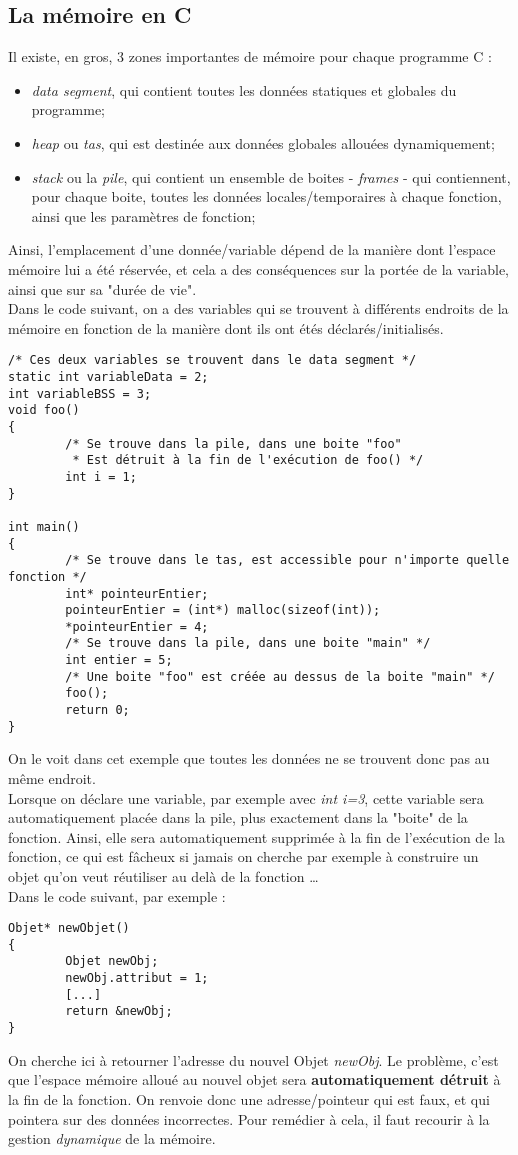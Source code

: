 \documentclass{report}
\begin{document}
\subsection{La mémoire en C}
Il existe, en gros, 3 zones importantes de mémoire pour chaque programme C :
\begin{itemize}
\item{\emph{data segment}, qui contient toutes les données statiques et globales du programme;}
\item{\emph{heap} ou \emph{tas}, qui est destinée aux données globales allouées dynamiquement;}
\item{\emph{stack} ou la \emph{pile}, qui contient un ensemble de boites - \emph{frames} - qui contiennent, pour chaque boite, toutes les données locales/temporaires à chaque fonction, ainsi que les paramètres de fonction;}
\end{itemize}
Ainsi, l'emplacement d'une donnée/variable dépend de la manière dont l'espace mémoire lui a été réservée, et cela a des conséquences sur la portée de la variable, ainsi que sur sa "durée de vie". \\
Dans le code suivant, on a des variables qui se trouvent à différents endroits de la mémoire en fonction de la manière dont ils ont étés déclarés/initialisés.
\begin{lstlisting}
/* Ces deux variables se trouvent dans le data segment */
static int variableData = 2;
int variableBSS = 3;
void foo()
{
        /* Se trouve dans la pile, dans une boite "foo"
         * Est détruit à la fin de l'exécution de foo() */
        int i = 1;
}

int main()
{
        /* Se trouve dans le tas, est accessible pour n'importe quelle fonction */
        int* pointeurEntier;
        pointeurEntier = (int*) malloc(sizeof(int));
        *pointeurEntier = 4;
        /* Se trouve dans la pile, dans une boite "main" */
        int entier = 5;
        /* Une boite "foo" est créée au dessus de la boite "main" */
        foo();
        return 0;
}

\end{lstlisting}
On le voit dans cet exemple que toutes les données ne se trouvent donc pas au même endroit.\\
Lorsque on déclare une variable, par exemple avec \emph{int i=3}, cette variable sera automatiquement placée dans la pile, plus exactement dans la "boite" de la fonction.
Ainsi, elle sera automatiquement supprimée à la fin de l'exécution de la fonction, ce qui est fâcheux si jamais on cherche par exemple à construire un objet qu'on veut réutiliser au delà de la fonction \ldots\\
Dans le code suivant, par exemple :
\begin{lstlisting}
Objet* newObjet()
{
        Objet newObj;
        newObj.attribut = 1;
        [...]
        return &newObj;
}
\end{lstlisting}
On cherche ici à retourner l'adresse du nouvel Objet \emph{newObj}.
Le problème, c'est que l'espace mémoire alloué au nouvel objet sera \textbf{automatiquement détruit} à la fin de la fonction.
On renvoie donc une adresse/pointeur qui est faux, et qui pointera sur des données incorrectes.
Pour remédier à cela, il faut recourir à la gestion \emph{dynamique} de la mémoire.\\
\end{document}
